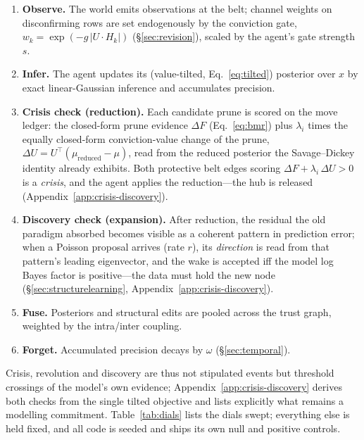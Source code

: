 \documentclass[11pt]{article}
\begin{document}
\begin{enumerate}\itemsep1pt
\item \textbf{Observe.} The world emits observations at the belt; channel weights on disconfirming
rows are set endogenously by the conviction gate, $w_k=\exp(-g\,|U\!\cdot\!H_k|)$
(\S\ref{sec:revision}), scaled by the agent's gate strength $s$.
\item \textbf{Infer.} The agent updates its (value-tilted, Eq.~\ref{eq:tilted}) posterior over $x$ by
exact linear-Gaussian inference and accumulates precision.
\item \textbf{Crisis check (reduction).} Each candidate prune is scored on the move ledger: the
closed-form prune evidence $\Delta F$ (Eq.~\ref{eq:bmr}) plus $\lambda_i$ times the equally
closed-form conviction-value change of the prune,
$\Delta U = U^{\!\top}\!(\mu_{\mathrm{reduced}}-\mu)$, read from the reduced posterior the
Savage--Dickey identity already exhibits. Both protective belt edges scoring
$\Delta F + \lambda_i\,\Delta U > 0$ is a \emph{crisis}, and the agent applies the reduction---the
hub is released (Appendix~\ref{app:crisis-discovery}).
\item \textbf{Discovery check (expansion).} After reduction, the residual the old paradigm absorbed
becomes visible as a coherent pattern in prediction error; when a Poisson proposal arrives (rate
$r$), its \emph{direction} is read from that pattern's leading eigenvector, and the wake is
accepted iff the model log Bayes factor is positive---the data must hold the new node
(\S\ref{sec:structurelearning}, Appendix~\ref{app:crisis-discovery}).
\item \textbf{Fuse.} Posteriors and structural edits are pooled across the trust graph, weighted by
the intra/inter coupling.
\item \textbf{Forget.} Accumulated precision decays by $\omega$ (\S\ref{sec:temporal}).
\end{enumerate}

Crisis, revolution and discovery are thus not stipulated events but threshold crossings of the
model's own evidence; Appendix~\ref{app:crisis-discovery} derives both checks from the single
tilted objective and lists explicitly what remains a modelling commitment.
Table~\ref{tab:dials} lists the dials swept; everything else is held fixed, and
all code is seeded and ships its own null and positive controls.
\end{document}
